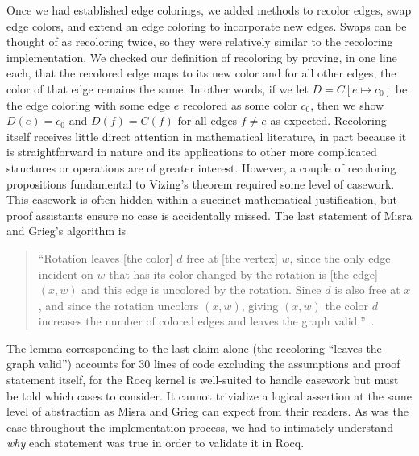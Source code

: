 Once we had established edge colorings, we added methods to recolor edges, swap edge colors, and extend an edge coloring to incorporate new edges. Swaps can be thought of as recoloring twice, so they were relatively similar to the recoloring implementation. We checked our definition of recoloring by proving, in one line each, that the recolored edge maps to its new color and for all other edges, the color of that edge remains the same. In other words, if we let $D = C[e \mapsto c_0]$ be the edge coloring with some edge $e$ recolored as some color $c_0$, then we show $D(e) = c_0$ and $D(f)  = C(f)$ for all edges $f \neq e$ as expected. Recoloring itself receives little direct attention in mathematical literature, in part because it is straightforward in nature and its applications to other more complicated structures or operations are of greater interest. However, a couple of recoloring propositions fundamental to Vizing's theorem required some level of casework. This casework is often hidden within a succinct mathematical justification, but proof assistants ensure no case is accidentally missed. The last statement of Misra and Grieg's algorithm is
\begin{quote}
``Rotation leaves [the color] $d$ free at [the vertex] $w$, since the only edge incident on $w$ that has its color changed by the rotation is [the edge] $(x, w)$ and this edge is uncolored by
the rotation. Since $d$ is also free at $x$, and since the rotation uncolors $(x, w)$, giving $(x, w)$ the color $d$ increases the number of colored edges and leaves the graph valid,''~\cite{Misra}.
\end{quote}
The lemma  corresponding to the last claim alone (the recoloring ``leaves the graph valid'') accounts for 30 lines of code excluding the assumptions and proof statement itself, for the Rocq kernel is well-suited to handle casework but must be told which cases to consider. It cannot trivialize a logical assertion at the same level of abstraction as Misra and Grieg can expect from their readers. As was the case throughout the implementation process, we had to intimately understand \textit{why} each statement was true in order to validate it in Rocq.

